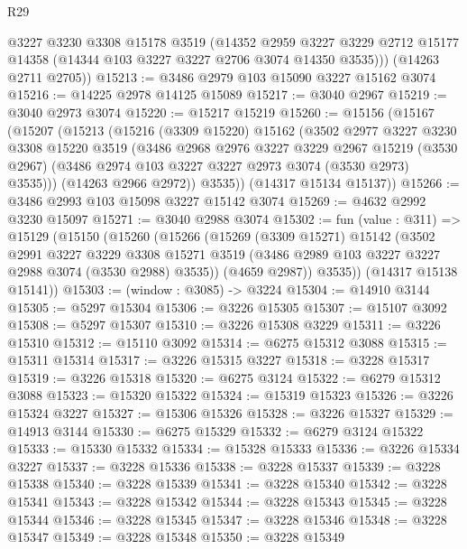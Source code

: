 \begin{lexlean}{R29}
\begin{coremodule}
        @3227
        @3230
        @3308
        @15178
        @3519
        (@14352
          @2959
          @3227
          @3229
          @2712
          @15177
          @14358
          (@14344 @103 @3227 @3227 @2706 @3074 @14350 @3535)))
      (@14263 @2711 @2705))
@15213 := @3486 @2979 @103 @15090 @3227 @15162 @3074
@15216 := @14225 @2978 @14125 @15089
@15217 := @3040 @2967
@15219 := @3040 @2973 @3074
@15220 := @15217 @15219
@15260 := @15156
    (@15167
      (@15207
        (@15213
          (@15216
            (@3309 @15220)
            @15162
            (@3502
              @2977
              @3227
              @3230
              @3308
              @15220
              @3519
              (@3486
                @2968
                @2976
                @3227
                @3229
                @2967
                @15219
                (@3530 @2967)
                (@3486 @2974 @103 @3227 @3227 @2973 @3074 (@3530 @2973) @3535)))
            (@14263 @2966 @2972))
          @3535))
      (@14317 @15134 @15137))
@15266 := @3486 @2993 @103 @15098 @3227 @15142 @3074
@15269 := @4632 @2992 @3230 @15097
@15271 := @3040 @2988 @3074
@15302 := fun (value : @311) =>
  @15129
    (@15150
      (@15260
        (@15266
          (@15269
            (@3309 @15271)
            @15142
            (@3502
              @2991
              @3227
              @3229
              @3308
              @15271
              @3519
              (@3486 @2989 @103 @3227 @3227 @2988 @3074 (@3530 @2988) @3535))
            (@4659 @2987))
          @3535))
      (@14317 @15138 @15141))
@15303 := (window : @3085) -> @3224
@15304 := @14910 @3144
@15305 := @5297 @15304
@15306 := @3226 @15305
@15307 := @15107 @3092
@15308 := @5297 @15307
@15310 := @3226 @15308 @3229
@15311 := @3226 @15310
@15312 := @15110 @3092
@15314 := @6275 @15312 @3088
@15315 := @15311 @15314
@15317 := @3226 @15315 @3227
@15318 := @3228 @15317
@15319 := @3226 @15318
@15320 := @6275 @3124
@15322 := @6279 @15312 @3088
@15323 := @15320 @15322
@15324 := @15319 @15323
@15326 := @3226 @15324 @3227
@15327 := @15306 @15326
@15328 := @3226 @15327
@15329 := @14913 @3144
@15330 := @6275 @15329
@15332 := @6279 @3124 @15322
@15333 := @15330 @15332
@15334 := @15328 @15333
@15336 := @3226 @15334 @3227
@15337 := @3228 @15336
@15338 := @3228 @15337
@15339 := @3228 @15338
@15340 := @3228 @15339
@15341 := @3228 @15340
@15342 := @3228 @15341
@15343 := @3228 @15342
@15344 := @3228 @15343
@15345 := @3228 @15344
@15346 := @3228 @15345
@15347 := @3228 @15346
@15348 := @3228 @15347
@15349 := @3228 @15348
@15350 := @3228 @15349

\end{coremodule}
\end{lexlean}
